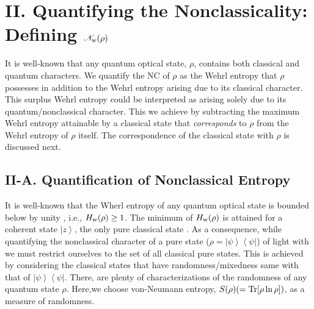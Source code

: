 \documentclass[letter,scriptaddress,twocolumn,prl,showkeys]{revtex4}
\newcommand{\ket}[1]{\left| #1 \right\rangle}
\newcommand{\bra}[1]{\left\langle #1 \right|}
\begin{document}
\section*{II. Quantifying the Nonclassicality: Defining $\mathscr{N}_{\rm{w}}(\rho)$}

It is well-known that any quantum optical state, $\rho$, contains both classical and quantum characters. 
We quantify the NC of $\rho$ as the Wehrl entropy that $\rho$ possesses in addition to the Wehrl entropy arising due to its classical character. 
This surplus Wehrl entropy could be interpreted as arising solely due to its quantum/nonclassical character. 
This we achieve by subtracting the maximum Wehrl entropy attainable by a classical state that {\em corresponds} to $\rho$ from the Wehrl entropy of $\rho$ itself. 
The correspondence of the classical state with $\rho$ is discussed next.


\subsection*{II-A. Quantification of Nonclassical Entropy}

It is well-known that the Wherl entropy of any quantum optical state is bounded below by unity \cite{we_min_lieb}, i.e., $H_{\rm{w}}(\rho)\geq 1$. 
The minimum of $H_{\rm{w}}(\rho)$ is attained for a coherent state $\ket z$, the only pure classical state \cite{cls_pure_hillery}. 
As a consequence, while quantifying the nonclassical character of a pure state ($\rho=\ket\psi\bra\psi$) of light with we must restrict ourselves to the set of all classical pure states. 
This is achieved by considering the classical states that have randomness/mixedness same with that of $\ket\psi\bra\psi$. 
There, are plenty of characterizations of the randomness of any quantum state $\rho$. 
Here,we choose von-Neumann entropy, $S(\rho)(=\rm{Tr}[\rho\ln\rho])$, as a measure of randomness. 
\end{document}
